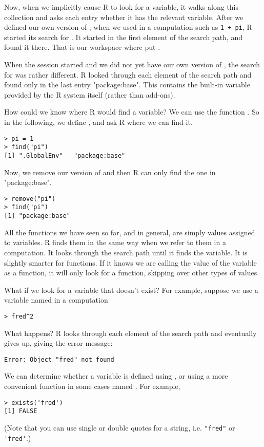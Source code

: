 Now, when we implicitly cause R to look for a variable, it walks along
this collection and asks each entry whether it has the relevant
variable. After we defined our own version of , when we
used  in a computation such as \verb|1 + pi|, R started
its search for . It started in the first element of the
search path, and found it there. That is our workspace where put
.

 When the session started and we did not yet have our own version of , the search for  was rather different. R looked through each element of the search path and found  only in the last entry "package:base". This contains the built-in variable provided by the R system itself (rather than add-ons). 

 How could we know where R would find a variable? We can use the function . So in the following, we define , and ask R where we can find it. 
\begin{verbatim}
> pi = 1
> find("pi")
[1] ".GlobalEnv"   "package:base"
\end{verbatim}
Now, we remove our version of  and then R can only find the one in "package:base". 
\begin{verbatim}
> remove("pi")
> find("pi")
[1] "package:base"
\end{verbatim}
All the functions we have seen so far, and in general, are simply
values assigned to variables. R finds them in the same way when we
refer to them in a computation. It looks through the search path until
it finds the variable. It is slightly smarter for functions. If it
knows we are calling the value of the variable as a function, it will
only look for a function, skipping over other types of values.

What if we look for a variable that doesn't exist? For example,
suppose we use a variable named  in a computation
\begin{verbatim}
> fred^2
\end{verbatim}
What happens? R looks through each element of the search path and
eventually gives up, giving the error message:
\begin{verbatim}
Error: Object "fred" not found
\end{verbatim}
We can determine whether a variable is defined using ,
or using a more convenient function in some cases named
. For example,
\begin{verbatim}
> exists('fred')
[1] FALSE
\end{verbatim}
(Note that you can use single or double quotes for a string,
i.e. \verb+"fred"+ or \verb+'fred'+.)


